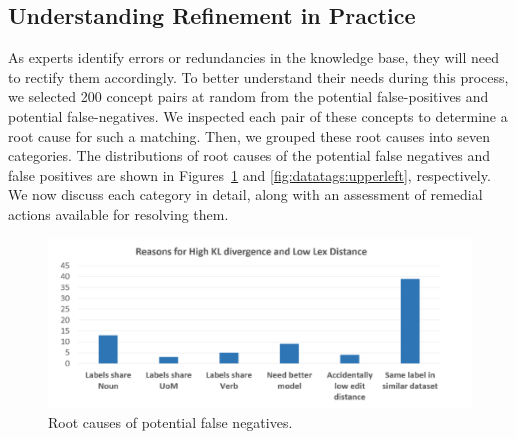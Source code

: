 


\subsection{Understanding Refinement in Practice}
As experts identify errors or redundancies in the knowledge base, they will need to rectify them accordingly.
To better understand their needs during this process, we selected 200 concept pairs at random from the potential false-positives and potential false-negatives.
We inspected each pair of these concepts to determine a root cause for such a matching.
Then, we grouped these root causes into seven categories.
The distributions of root causes of the potential false negatives and false positives are shown in Figures~\ref{fig:datatags:lowerright} and \ref{fig:datatags:upperleft}, respectively.
We now discuss each category in detail, along with an assessment of remedial actions available for resolving them.

\begin{figure}
	\centering
	\includegraphics[width=\columnwidth]{graphics/Lower_right_quad}
	\caption{Root causes of potential false negatives.}
	\label{fig:datatags:lowerright}
	\trimfigurespacing
\end{figure}

